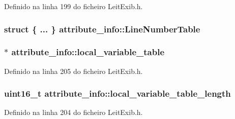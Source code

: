 Definido na linha 199 do ficheiro Leit\-Exib.\-h.

\hypertarget{structattribute__info_af6b14486315fa8c2d5b49b82e209c9aa}{
\subsubsection[{Line\-Number\-Table}]{\setlength{\rightskip}{0pt plus 5cm}struct \{ ... \}   attribute\-\_\-info\-::\-Line\-Number\-Table}}\label{structattribute__info_af6b14486315fa8c2d5b49b82e209c9aa}
\hypertarget{structattribute__info_aa3c58444ef5605c7dc24c82b3c76e7df}{
\subsubsection[{local\-\_\-variable\-\_\-table}]{$\ast$ attribute\-\_\-info\-::local\-\_\-variable\-\_\-table}}\label{structattribute__info_aa3c58444ef5605c7dc24c82b3c76e7df}


Definido na linha 205 do ficheiro Leit\-Exib.\-h.

\hypertarget{structattribute__info_a213dab40b46591df77874456f17d9282}{
\subsubsection[{local\-\_\-variable\-\_\-table\-\_\-length}]{\setlength{\rightskip}{0pt plus 5cm}uint16\-\_\-t attribute\-\_\-info\-::local\-\_\-variable\-\_\-table\-\_\-length}}\label{structattribute__info_a213dab40b46591df77874456f17d9282}


Definido na linha 204 do ficheiro Leit\-Exib.\-h.

